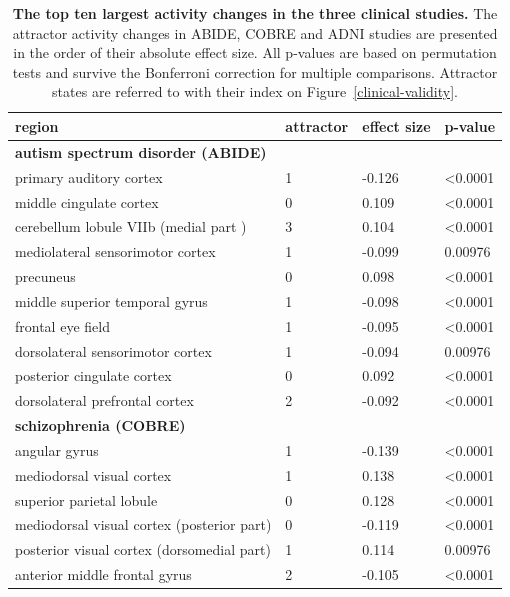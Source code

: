\documentclass{article}
\begin{document}
\begin{table}
\centering
\caption[]{\textbf{The top ten largest activity changes in the three clinical studies.}  The attractor activity changes in ABIDE, COBRE and ADNI studies are presented in the order of their absolute effect size. All p-values are based on permutation tests and survive the Bonferroni correction for multiple comparisons. Attractor states are referred to with their index on Figure~\ref{clinical-validity}.}
\label{tab-clinical-results}
\begin{tabular}{p{}p{}p{}p{}}
\toprule
region & attractor & effect size & p-value \\
\hline
\textbf{autism spectrum disorder (ABIDE)} &  &  &  \\
primary auditory cortex & 1 & -0.126 & \textless 0.0001 \\
middle cingulate cortex & 0 & 0.109 & \textless 0.0001 \\
cerebellum lobule VIIb (medial part  ) & 3 & 0.104 & \textless 0.0001 \\
mediolateral sensorimotor cortex & 1 & -0.099 & 0.00976 \\
precuneus & 0 & 0.098 & \textless 0.0001 \\
middle superior temporal gyrus & 1 & -0.098 & \textless 0.0001 \\
frontal eye field & 1 & -0.095 & \textless 0.0001 \\
dorsolateral sensorimotor cortex & 1 & -0.094 & 0.00976 \\
posterior cingulate cortex & 0 & 0.092 & \textless 0.0001 \\
dorsolateral prefrontal cortex & 2 & -0.092 & \textless 0.0001 \\
\textbf{schizophrenia (COBRE)} &  &  &  \\
angular gyrus & 1 & -0.139 & \textless 0.0001 \\
mediodorsal visual cortex & 1 & 0.138 & \textless 0.0001 \\
superior parietal lobule & 0 & 0.128 & \textless 0.0001 \\
mediodorsal visual cortex (posterior part) & 0 & -0.119 & \textless 0.0001 \\
posterior visual cortex (dorsomedial part) & 1 & 0.114 & 0.00976 \\
anterior middle frontal gyrus & 2 & -0.105 & \textless 0.0001 \\

\end{tabular}
\end{table}
\end{document}
